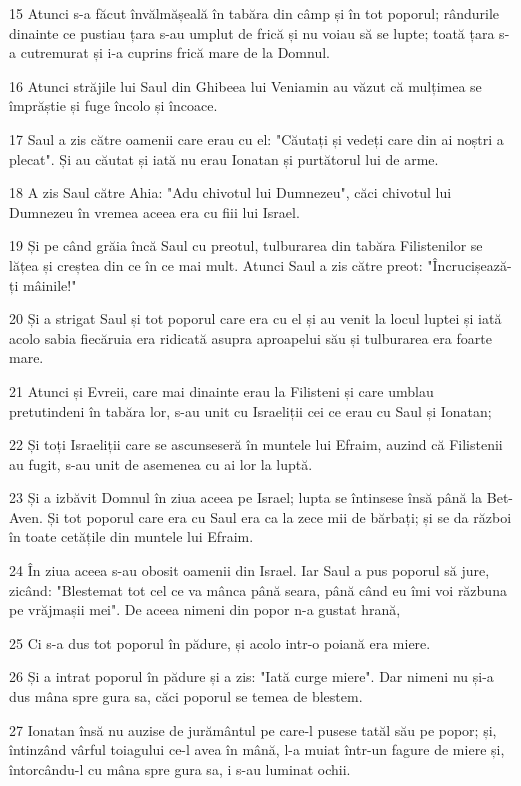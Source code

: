 \par 15 Atunci s-a făcut învălmășeală în tabăra din câmp și în tot poporul; rândurile dinainte ce pustiau țara s-au umplut de frică și nu voiau să se lupte; toată țara s-a cutremurat și i-a cuprins frică mare de la Domnul.
\par 16 Atunci străjile lui Saul din Ghibeea lui Veniamin au văzut că mulțimea se împrăștie și fuge încolo și încoace.
\par 17 Saul a zis către oamenii care erau cu el: "Căutați și vedeți care din ai noștri a plecat". Și au căutat și iată nu erau Ionatan și purtătorul lui de arme.
\par 18 A zis Saul către Ahia: "Adu chivotul lui Dumnezeu", căci chivotul lui Dumnezeu în vremea aceea era cu fiii lui Israel.
\par 19 Și pe când grăia încă Saul cu preotul, tulburarea din tabăra Filistenilor se lățea și creștea din ce în ce mai mult. Atunci Saul a zis către preot: "Încrucișează-ți mâinile!"
\par 20 Și a strigat Saul și tot poporul care era cu el și au venit la locul luptei și iată acolo sabia fiecăruia era ridicată asupra aproapelui său și tulburarea era foarte mare.
\par 21 Atunci și Evreii, care mai dinainte erau la Filisteni și care umblau pretutindeni în tabăra lor, s-au unit cu Israeliții cei ce erau cu Saul și Ionatan;
\par 22 Și toți Israeliții care se ascunseseră în muntele lui Efraim, auzind că Filistenii au fugit, s-au unit de asemenea cu ai lor la luptă.
\par 23 Și a izbăvit Domnul în ziua aceea pe Israel; lupta se întinsese însă până la Bet-Aven. Și tot poporul care era cu Saul era ca la zece mii de bărbați; și se da război în toate cetățile din muntele lui Efraim.
\par 24 În ziua aceea s-au obosit oamenii din Israel. Iar Saul a pus poporul să jure, zicând: "Blestemat tot cel ce va mânca până seara, până când eu îmi voi răzbuna pe vrăjmașii mei". De aceea nimeni din popor n-a gustat hrană,
\par 25 Ci s-a dus tot poporul în pădure, și acolo intr-o poiană era miere.
\par 26 Și a intrat poporul în pădure și a zis: "Iată curge miere". Dar nimeni nu și-a dus mâna spre gura sa, căci poporul se temea de blestem.
\par 27 Ionatan însă nu auzise de jurământul pe care-l pusese tatăl său pe popor; și, întinzând vârful toiagului ce-l avea în mână, l-a muiat într-un fagure de miere și, întorcându-l cu mâna spre gura sa, i s-au luminat ochii.
